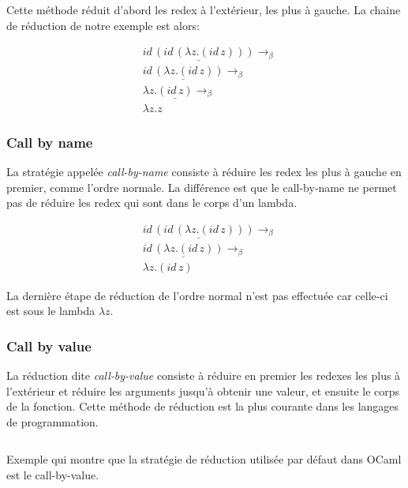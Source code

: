 Cette méthode réduit d'abord les redex à l'extérieur, les plus à gauche.
La chaine de réduction de notre exemple est alors:

\begin{align*}
  & \underline{id \, (id \, (\lambda z . (id \, z)))} \rightarrow_{\beta}\\
  & \underline{id \, (\lambda z . (id \, z))} \rightarrow_{\beta} \\
  & \lambda z . \underline{(id \, z)} \rightarrow_{\beta} \\
  & \lambda z . z
\end{align*}

\subsubsection*{Call by name}

La stratégie appelée \textit{call-by-name} consiste à réduire les redex les plus
à gauche en premier, comme l'ordre normale. La différence est que le
call-by-name ne permet pas de réduire les redex qui sont dans le corps d'un lambda.

\begin{align*}
  & \underline{id \, (id \, (\lambda z . (id \, z)))} \rightarrow_{\beta}\\
  & \underline{id \, (\lambda z . (id \, z))} \rightarrow_{\beta} \\
  & \lambda z . (id \, z)
\end{align*}

La dernière étape de réduction de l'ordre normal n'est pas effectuée car celle-ci est
sous le lambda $\lambda z$.

\subsubsection*{Call by value}

La réduction dite \textit{call-by-value} consiste à réduire en premier les
redexes les plus à l'extérieur et réduire les arguments jusqu'à obtenir une valeur, et ensuite le corps de la fonction.
Cette méthode de réduction est la plus courante dans les langages de
programmation.

\begin{listing}
  \inputminted{OCaml}{codes/untyped-call-by-value-example.ml}
  \caption{Exemple qui montre que la stratégie de réduction utilisée par défaut
    dans OCaml est le call-by-value.}
\end{listing}

